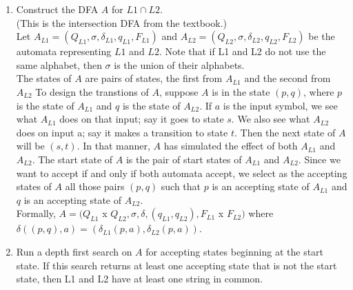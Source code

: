 \documentclass[a4paper]{article}
\begin{document}
\begin{enumerate}

\item Construct the DFA $A$ for $L1 \cap L2$. \\
(This is the intersection DFA from the textbook.) \\
Let $A_{L1} = (Q_{L1}, \sigma, \delta_{L1}, q_{L1}, F_{L1})$ and $A_{L2} = (Q_{L2}, \sigma, \delta_{L2}, q_{L2}, F_{L2})$ be the automata representing $L1$ and $L2$. Note that if L1 and L2 do not use the same alphabet, then $\sigma$ is the union of their alphabets.
\\

The states of $A$ are pairs of states, the first from $A_{L1}$ and the second from $A_{L2}$ To design the transtions of $A$, suppose $A$ is in the state $(p,q)$, where $p$ is the state of $A_{L1}$ and $q$ is the state of $A_{L2}$. If $a$ is the input symbol, we see what $A_{L1}$ does on that input; say it goes to state $s$. We also see what $A_{L2}$ does on input a; say it makes a transition to state $t$. Then the next state of $A$ will be $(s,t)$. In that manner, $A$ has simulated the effect of both $A_{L1}$ and $A_{L2}$. The start state of $A$ is the pair of start states of $A_{L1}$ and $A_{L2}$. Since we want to accept if and only if both automata accept, we select as the accepting states of $A$ all those pairs $(p,q)$ such that $p$ is an accepting state of $A_{L1}$ and $q$ is an accepting state of $A_{L2}$.
\\

Formally, $A=(Q_{L1}$ x $Q_{L2},\sigma,\delta,(q_{L1}, q_{L2}), F_{L1}$ x $F_{L2})$ where $\delta((p,q),a) = (\delta_{L1}(p,a),\delta_{L2}(p,a))$.

\item Run a depth first search on $A$ for accepting states beginning at the start state. If this search returns at least one accepting state that is not the start state, then L1 and L2 have at least one string in common.


\end{enumerate}
\end{document}
